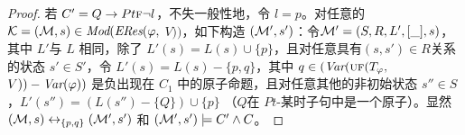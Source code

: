 \begin{proof}
	若 $C'= Q\rightarrow Pt \textsc{f} \neg l$，不失一般性地，令 $l=p$。对任意的 ${\cal K}=({\cal M}, s)\in \textit{Mod}(\emph{ERes}(\varphi,$ $V))$，如下构造 $({\cal M}',s')$：令${\cal M}'=(S, R, L',[\_], s)$，其中 $L'$与 $L$ 相同，除了
	$L'(s) = L(s) \cup \{p\}$，且对任意具有$(s, s')\in R$关系的状态 $s'\in S'$，令 $L'(s) = L(s) - \{p, q\}$，其中 $q \in (\textit{Var}(\textsc{uf}(T_\varphi,$ $V))-\textit{Var}(\varphi))$ 是负出现在 $C_1$ 中的原子命题，且对任意其他的非初始状态 $s'' \in S$，$L'(s'') = (L(s'') - \{Q\}) \cup \{p\}$ （$Q$在 $Pt$-某时子句中是一个原子）。显然 $({\cal M}, s) \leftrightarrow_{\{p,q\}} ({\cal M}', s')$ 和 $({\cal M}', s') \models C' \wedge C$。
	

\end{proof}
